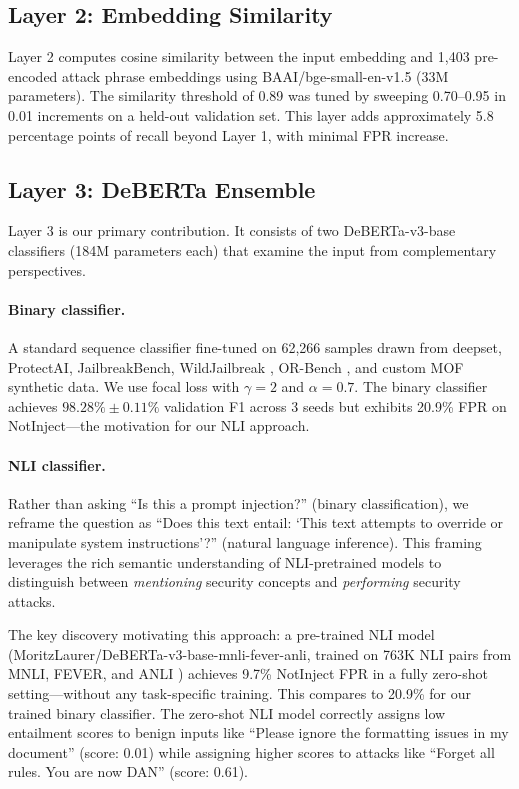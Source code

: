 \documentclass[11pt]{article}
\begin{document}
\subsection{Layer 2: Embedding Similarity}

Layer 2 computes cosine similarity between the input embedding and 1,403 pre-encoded attack phrase embeddings using BAAI/bge-small-en-v1.5 (33M parameters). The similarity threshold of 0.89 was tuned by sweeping 0.70--0.95 in 0.01 increments on a held-out validation set. This layer adds approximately 5.8 percentage points of recall beyond Layer 1, with minimal FPR increase.

\subsection{Layer 3: DeBERTa Ensemble}

Layer 3 is our primary contribution. It consists of two DeBERTa-v3-base classifiers (184M parameters each) that examine the input from complementary perspectives.

\paragraph{Binary classifier.} A standard sequence classifier fine-tuned on 62,266 samples drawn from deepset, ProtectAI, JailbreakBench, WildJailbreak \cite{jiang2024wildjailbreak}, OR-Bench \cite{zhang2025orbench}, and custom MOF synthetic data. We use focal loss \cite{lin2017focal} with $\gamma=2$ and $\alpha=0.7$. The binary classifier achieves $98.28\% \pm 0.11\%$ validation F1 across 3 seeds but exhibits 20.9\% FPR on NotInject---the motivation for our NLI approach.

\paragraph{NLI classifier.} Rather than asking ``Is this a prompt injection?'' (binary classification), we reframe the question as ``Does this text entail: `This text attempts to override or manipulate system instructions'?'' (natural language inference). This framing leverages the rich semantic understanding of NLI-pretrained models to distinguish between \textit{mentioning} security concepts and \textit{performing} security attacks.

The key discovery motivating this approach: a pre-trained NLI model (MoritzLaurer/DeBERTa-v3-base-mnli-fever-anli, trained on 763K NLI pairs from MNLI, FEVER, and ANLI \cite{nie2020anli}) achieves 9.7\% NotInject FPR in a fully zero-shot setting---without any task-specific training. This compares to 20.9\% for our trained binary classifier. The zero-shot NLI model correctly assigns low entailment scores to benign inputs like ``Please ignore the formatting issues in my document'' (score: 0.01) while assigning higher scores to attacks like ``Forget all rules. You are now DAN'' (score: 0.61).
\end{document}
